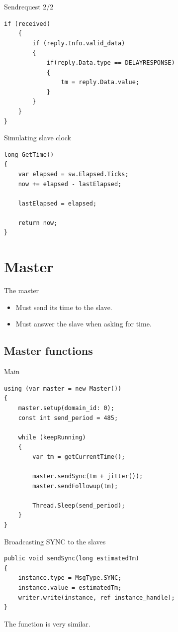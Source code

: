 \documentclass[compressed, presentation, notheorems, 12pt]{beamer}
\begin{document}
	\begin{frame}[containsverbatim]{Sendrequest 2/2}
	\begin{lstlisting}[style=Code-C++]
	if (received)
	{
		if (reply.Info.valid_data)
		{
			if(reply.Data.type == DELAYRESPONSE)
			{
				tm = reply.Data.value;
			}
		}
	}
}
	\end{lstlisting}
	\end{frame}

\begin{frame}[containsverbatim]{Simulating slave clock}
	\begin{lstlisting}[style=Code-C++]
long GetTime()
{
	var elapsed = sw.Elapsed.Ticks;
	now += elapsed - lastElapsed;

	lastElapsed = elapsed;

	return now;
}
	\end{lstlisting}
	\end{frame}

\section{Master}

	\begin{frame}{The master}
	\begin{itemize}
		\item Must send its time to the slave.
		\item Must answer the slave when asking for time.
	\end{itemize}
	\end{frame}


\subsection{Master functions}
	\begin{frame}[containsverbatim]{Main}
	\begin{lstlisting}[style=Code-C++]
using (var master = new Master())
{
	master.setup(domain_id: 0);
	const int send_period = 485; 

	while (keepRunning)
	{
		var tm = getCurrentTime();

		master.sendSync(tm + jitter());
		master.sendFollowup(tm);						

		Thread.Sleep(send_period);
	}
}
	\end{lstlisting}
	\end{frame}

 	

	\begin{frame}[containsverbatim]{Broadcasting SYNC to the slaves}
	\begin{lstlisting}[style=Code-C++]
public void sendSync(long estimatedTm)
{
	instance.type = MsgType.SYNC;
	instance.value = estimatedTm;
	writer.write(instance, ref instance_handle);
}
	\end{lstlisting}

	The function  is very similar.
	\end{frame}
\end{document}
